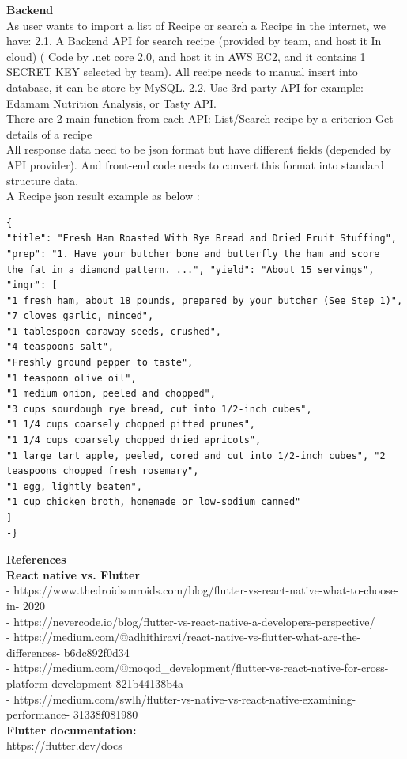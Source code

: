 \documentclass{article}
\begin{document}
\textbf{Backend} \\
As user wants to import a list of Recipe or search a Recipe in the internet, we have: 2.1. A Backend API for search recipe (provided by team, and host it In cloud) ( Code by .net core 2.0, and host it in AWS EC2, and it contains 1 SECRET KEY selected by team). All recipe needs to manual insert into database, it can be store by MySQL. 2.2. Use 3rd party API for example: Edamam Nutrition Analysis, or Tasty API. \\
There are 2 main function from each API: List/Search recipe by a criterion Get details of a recipe \\
All response data need to be json format but have different fields (depended by API provider). And front-end code needs to convert this format into standard structure data. \\
A Recipe json result example as below : \\
\begin{lstlisting}
{
"title": "Fresh Ham Roasted With Rye Bread and Dried Fruit Stuffing", "prep": "1. Have your butcher bone and butterfly the ham and score
the fat in a diamond pattern. ...", "yield": "About 15 servings", "ingr": [
"1 fresh ham, about 18 pounds, prepared by your butcher (See Step 1)",
"7 cloves garlic, minced",
"1 tablespoon caraway seeds, crushed",
"4 teaspoons salt",
"Freshly ground pepper to taste",
"1 teaspoon olive oil",
"1 medium onion, peeled and chopped",
"3 cups sourdough rye bread, cut into 1/2-inch cubes",
"1 1/4 cups coarsely chopped pitted prunes",
"1 1/4 cups coarsely chopped dried apricots",
"1 large tart apple, peeled, cored and cut into 1/2-inch cubes", "2 teaspoons chopped fresh rosemary",
"1 egg, lightly beaten",
"1 cup chicken broth, homemade or low-sodium canned"
] 
-}
\end{lstlisting}

\textbf{References}  \\
\textbf{React native vs. Flutter } \\
- https://www.thedroidsonroids.com/blog/flutter-vs-react-native-what-to-choose-in-
2020 \\
- https://nevercode.io/blog/flutter-vs-react-native-a-developers-perspective/ \\
- https://medium.com/@adhithiravi/react-native-vs-flutter-what-are-the-differences-
b6dc892f0d34 \\
- https://medium.com/@moqod_development/flutter-vs-react-native-for-cross- platform-development-821b44138b4a \\
- https://medium.com/swlh/flutter-vs-native-vs-react-native-examining-performance- 31338f081980 \\
\textbf{Flutter documentation: }  \\
https://flutter.dev/docs \\
\end{document}
